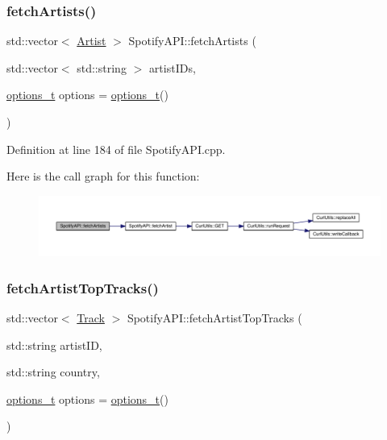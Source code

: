 \subsubsection{\texorpdfstring{fetch\+Artists()}{fetchArtists()}}
{\footnotesize\ttfamily std\+::vector$<$ \mbox{\hyperlink{class_artist}{Artist}} $>$ Spotify\+A\+P\+I\+::fetch\+Artists (\begin{DoxyParamCaption}\item[{std\+::vector$<$ std\+::string $>$}]{artist\+I\+Ds,  }\item[{\mbox{\hyperlink{_spotify_a_p_i_8h_a0ff5cac1a4007bb330b7d9939650c283}{options\+\_\+t}}}]{options = {\ttfamily \mbox{\hyperlink{_spotify_a_p_i_8h_a0ff5cac1a4007bb330b7d9939650c283}{options\+\_\+t}}()} }\end{DoxyParamCaption})}



Definition at line 184 of file Spotify\+A\+P\+I.\+cpp.

Here is the call graph for this function\+:
\nopagebreak
\begin{figure}[H]
\begin{center}
\leavevmode
\includegraphics[width=350pt]{class_spotify_a_p_i_af0dbdda3a69fea10e88175e033884c8a_cgraph}
\end{center}
\end{figure}
\mbox{\label{class_spotify_a_p_i_a29a225f2f09d8a189b9c6214423cfe7e}} 
\subsubsection{\texorpdfstring{fetch\+Artist\+Top\+Tracks()}{fetchArtistTopTracks()}}
{\footnotesize\ttfamily std\+::vector$<$ \mbox{\hyperlink{class_track}{Track}} $>$ Spotify\+A\+P\+I\+::fetch\+Artist\+Top\+Tracks (\begin{DoxyParamCaption}\item[{std\+::string}]{artist\+ID,  }\item[{std\+::string}]{country,  }\item[{\mbox{\hyperlink{_spotify_a_p_i_8h_a0ff5cac1a4007bb330b7d9939650c283}{options\+\_\+t}}}]{options = {\ttfamily \mbox{\hyperlink{_spotify_a_p_i_8h_a0ff5cac1a4007bb330b7d9939650c283}{options\+\_\+t}}()} }\end{DoxyParamCaption})}



